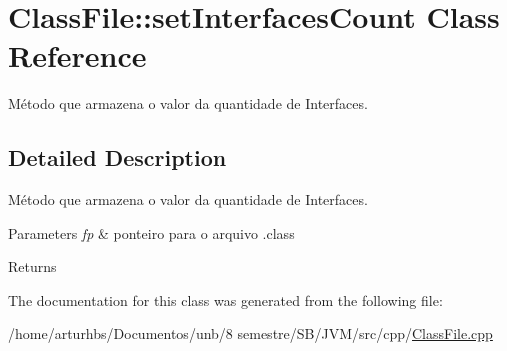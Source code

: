 \hypertarget{classClassFile_1_1setInterfacesCount}{}\section{Class\+File\+:\+:set\+Interfaces\+Count Class Reference}
\label{classClassFile_1_1setInterfacesCount}


Método que armazena o valor da quantidade de Interfaces.  




\subsection{Detailed Description}
Método que armazena o valor da quantidade de Interfaces. 


\begin{DoxyParams}{Parameters}
{\em fp} & ponteiro para o arquivo .class \\
\hline
\end{DoxyParams}
\begin{DoxyReturn}{Returns}

\end{DoxyReturn}


The documentation for this class was generated from the following file\+:\begin{DoxyCompactItemize}
\item 
/home/arturhbs/\+Documentos/unb/8 semestre/\+S\+B/\+J\+V\+M/src/cpp/\hyperlink{ClassFile_8cpp}{Class\+File.\+cpp}\end{DoxyCompactItemize}
